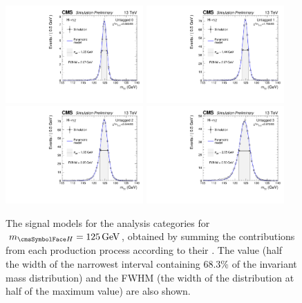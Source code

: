 \begin{figure}[ht!]
\centering
\includegraphics[width=0.47\textwidth]{modellingFigures/DCBpG/UntaggedTag_0.pdf} 
\includegraphics[width=0.47\textwidth]{modellingFigures/DCBpG/UntaggedTag_1.pdf} \\
\includegraphics[width=0.47\textwidth]{modellingFigures/DCBpG/UntaggedTag_2.pdf} 
\includegraphics[width=0.47\textwidth]{modellingFigures/DCBpG/UntaggedTag_3.pdf} \\ 

\caption{The signal models for the \Untagged analysis categories for $\mH=125\GeV$, obtained by summing the contributions from each production process according to their \effxacc. The \effSigma value (half the width of the narrowest interval containing 68.3\% of the invariant mass distribution) and the FWHM (the width of the distribution at half of the maximum value) are also shown.}

\label{fig:model:sig_model_per_category}
\end{figure}

